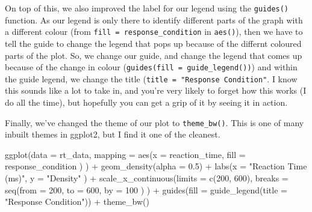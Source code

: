\documentclass[
]{book}
\newenvironment{Shaded}{\begin{snugshade}}{\end{snugshade}}
\newcommand{\AttributeTok}[1]{\textcolor[rgb]{0.77,0.63,0.00}{#1}}
\newcommand{\DecValTok}[1]{\textcolor[rgb]{0.00,0.00,0.81}{#1}}
\newcommand{\FloatTok}[1]{\textcolor[rgb]{0.00,0.00,0.81}{#1}}
\newcommand{\FunctionTok}[1]{\textcolor[rgb]{0.00,0.00,0.00}{#1}}
\newcommand{\NormalTok}[1]{#1}
\newcommand{\SpecialCharTok}[1]{\textcolor[rgb]{0.00,0.00,0.00}{#1}}
\newcommand{\StringTok}[1]{\textcolor[rgb]{0.31,0.60,0.02}{#1}}
\begin{document}
On top of this, we also improved the label for our legend using the \texttt{guides()} function. As our legend is only there to identify different parts of the graph with a different colour (from \texttt{fill\ =\ response\_condition} in \texttt{aes()}), then we have to tell the guide to change the legend that pops up because of the differnt coloured parts of the plot. So, we change our guide, and change the legend that comes up because of the change in colour (\texttt{guides(fill\ =\ guide\_legend())}) and within the guide legend, we change the title (\texttt{title\ =\ "Response\ Condition"}. I know this sounds like a lot to take in, and you're very likely to forget how this works (I do all the time), but hopefully you can get a grip of it by seeing it in action.

Finally, we've changed the theme of our plot to \texttt{theme\_bw()}. This is one of many inbuilt themes in ggplot2, but I find it one of the cleanest.

\begin{Shaded}
\begin{Highlighting}[]
\FunctionTok{ggplot}\NormalTok{(}\AttributeTok{data =}\NormalTok{ rt\_data, }
       \AttributeTok{mapping =} \FunctionTok{aes}\NormalTok{(}\AttributeTok{x =}\NormalTok{ reaction\_time, }
                     \AttributeTok{fill =}\NormalTok{ response\_condition}
\NormalTok{                     )}
\NormalTok{       ) }\SpecialCharTok{+}
  \FunctionTok{geom\_density}\NormalTok{(}\AttributeTok{alpha =} \FloatTok{0.5}\NormalTok{) }\SpecialCharTok{+}
  \FunctionTok{labs}\NormalTok{(}\AttributeTok{x =} \StringTok{"Reaction Time (ms)"}\NormalTok{, }
       \AttributeTok{y =} \StringTok{"Density"}
\NormalTok{       ) }\SpecialCharTok{+}
  \FunctionTok{scale\_x\_continuous}\NormalTok{(}\AttributeTok{limits =} \FunctionTok{c}\NormalTok{(}\DecValTok{200}\NormalTok{, }\DecValTok{600}\NormalTok{), }
                     \AttributeTok{breaks =} \FunctionTok{seq}\NormalTok{(}\AttributeTok{from =} \DecValTok{200}\NormalTok{, }
                                  \AttributeTok{to =} \DecValTok{600}\NormalTok{, }
                                  \AttributeTok{by =} \DecValTok{100}
\NormalTok{                                  )}
\NormalTok{                     ) }\SpecialCharTok{+}
  \FunctionTok{guides}\NormalTok{(}\AttributeTok{fill =} \FunctionTok{guide\_legend}\NormalTok{(}\AttributeTok{title =} \StringTok{"Response Condition"}\NormalTok{)) }\SpecialCharTok{+}
  \FunctionTok{theme\_bw}\NormalTok{()}
\end{Highlighting}
\end{Shaded}
\end{document}
